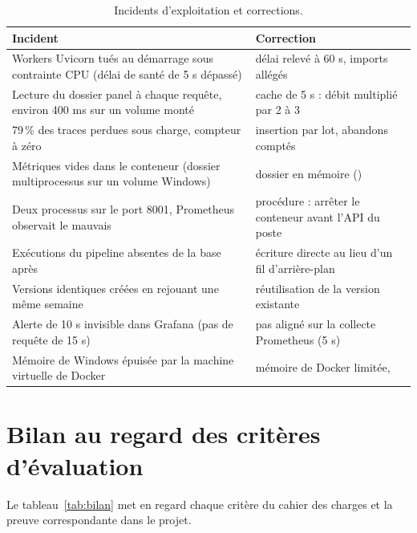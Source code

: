 \documentclass[11pt,a4paper]{article}
\newcommand{\code}[1]{\texttt{\detokenize{#1}}}
\begin{document}
\begin{table}[htbp]\centering\small
\begin{tabularx}{\linewidth}{X X}
\toprule
Incident & Correction\\
\midrule
Workers Uvicorn tués au démarrage sous contrainte CPU (délai de santé de 5 s dépassé) &
délai relevé à 60 s, imports allégés\\
Lecture du dossier panel à chaque requête, environ 400 ms sur un volume monté &
cache de 5 s : débit multiplié par 2 à 3\\
79\,\% des traces perdues sous charge, compteur à zéro &
insertion par lot, abandons comptés\\
Métriques vides dans le conteneur (dossier multiprocessus sur un volume Windows) &
dossier en mémoire (\code{tmpfs})\\
Deux processus sur le port 8001, Prometheus observait le mauvais &
procédure : arrêter le conteneur avant l'API du poste\\
Exécutions du pipeline absentes de la base après \code{retail replay} &
écriture directe au lieu d'un fil d'arrière-plan\\
Versions identiques créées en rejouant une même semaine &
réutilisation de la version existante\\
Alerte de 10 s invisible dans Grafana (pas de requête de 15 s) &
pas aligné sur la collecte Prometheus (5 s)\\
Mémoire de Windows épuisée par la machine virtuelle de Docker &
mémoire de Docker limitée, \code{OPENBLAS_NUM_THREADS=1}\\
\bottomrule
\end{tabularx}
\caption{Incidents d'exploitation et corrections.}\label{tab:incidents}
\end{table}

\section{Bilan au regard des critères d'évaluation}\label{sec:bilan}

Le tableau~\ref{tab:bilan} met en regard chaque critère du cahier des charges et la preuve
correspondante dans le projet.
\end{document}

